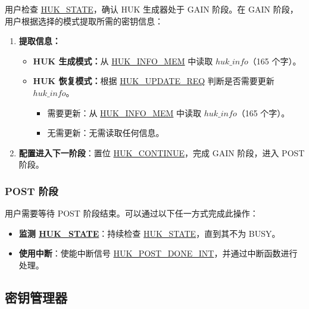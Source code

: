 \documentclass[main\_\_CN.tex]{subfiles}
\begin{document}
用户检查 \hyperref[fielddesc:HUKSTATE]{HUK\_STATE}，确认 HUK 生成器处于 GAIN 阶段。在 GAIN 阶段，用户根据选择的模式提取所需的密钥信息：
\begin{enumerate}
    \item \textbf{提取信息：}
    \begin{itemize}
        \item \textbf{HUK 生成模式：}从 \hyperref[mem:huk-info]{HUK\_INFO\_MEM} 中读取 \hyperref[para:hukinfo]{\begin{math}huk\_info\end{math}}（165 个字）。
        \item \textbf{HUK 恢复模式：}根据 \hyperref[fielddesc:HUKUPDATEREQ]{HUK\_UPDATE\_REQ} 判断是否需要更新 \hyperref[para:hukinfo]{\begin{math}huk\_info\end{math}}。
        \begin{itemize}
            \item 需要更新：从 \hyperref[mem:huk-info]{HUK\_INFO\_MEM} 中读取 \hyperref[para:hukinfo]{\begin{math}huk\_info\end{math}}（165 个字）。
            \item 无需更新：无需读取任何信息。
        \end{itemize}
    \end{itemize}
    \item \textbf{配置进入下一阶段}：置位 \hyperref[fielddesc:HUKCONTINUE]{HUK\_CONTINUE}，完成 GAIN 阶段，进入 POST 阶段。
\end{enumerate}

\subsubsection{POST 阶段}

用户需要等待 POST 阶段结束。可以通过以下任一方式完成此操作：
\begin{itemize}
    \item \textbf{监测 \hyperref[fielddesc:HUKSTATE]{HUK\_STATE}}：持续检查 \hyperref[fielddesc:HUKSTATE]{HUK\_STATE}，直到其不为 BUSY。
    \item \textbf{使用中断}：使能中断信号 \hyperref[int:HUKPOSTDONEINT]{HUK\_POST\_DONE\_INT}，并通过中断函数进行处理。
\end{itemize}


\subsection{密钥管理器}
\end{document}
